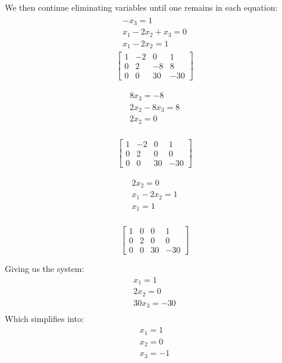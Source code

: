 \documentclass[12pt letter]{report}
\begin{document}
{{    \noindent We then continue eliminating variables until one remains in each equation:
    \begin{align*}
      \begin{split}
        -x_3 = 1             \\
        x_1 - 2x_2 + x_3 = 0 \\
        \hline
        x_1 - 2x_2 = 1
      \end{split}
    \end{align*}
    \[
      \begin{bmatrix} 1 & -2 & 0 & 1 \\ 0 & 2 & -8 & 8 \\ 0 & 0 & 30  &-30 \end{bmatrix}
    \]


    \begin{align*}
      \begin{split}
        8x_3 = -8       \\
        2x_2 - 8x_3 = 8 \\
        \hline
        2x_2 = 0        \\
      \end{split}
    \end{align*}

    \[
      \begin{bmatrix} 1 & -2 & 0 & 1 \\ 0 & 2& 0 & 0 \\ 0 & 0 & 30 & -30  \end{bmatrix}
    \]

    \begin{align*}
      \begin{split}
        2x_2 = 0       \\
        x_1 - 2x_2 = 1 \\
        \hline
        x_1 = 1        \\
      \end{split}
    \end{align*}

    \[
      \begin{bmatrix} 1 & 0 & 0 & 1 \\ 0 & 2 & 0 & 0 \\ 0 & 0 & 30 & -30  \end{bmatrix}
    \]

    Giving us the system:
    \begin{align*}
      x_1 = 1     \\
      2x_2 = 0    \\
      30x_3 = -30 \\
    \end{align*}
    Which simplifies into:
    \begin{align*}
      x_1 = 1 \\
      x_2 = 0 \\
      x_3 = -1
    \end{align*}

  }
}
\end{document}
